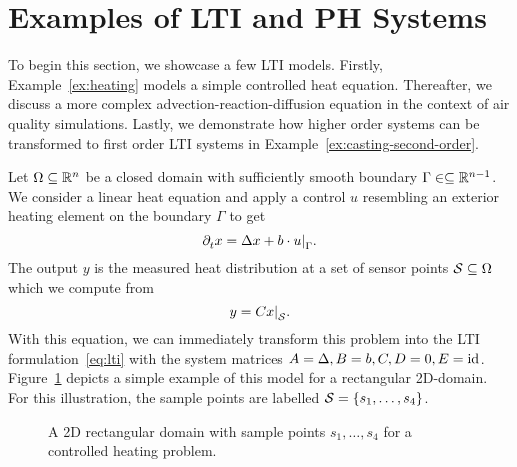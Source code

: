 \section{Examples of \texorpdfstring{\acs{LTI}}{LTI} and \texorpdfstring{\acs{PH}}{PH} Systems}\label{sec:examples}

To begin this section, we showcase a few \ac{LTI} models.
Firstly, Example~\ref{ex:heating} models a simple controlled heat equation.
Thereafter, we discuss a more complex advection-reaction-diffusion equation in the context of air quality simulations.
Lastly, we demonstrate how higher order systems can be transformed to first order \ac{LTI} systems in Example~\ref{ex:casting-second-order}.

\begin{example}\label{ex:heating}
    Let $\Omega \subseteq \mathbb{R}^n$ be a closed domain with sufficiently smooth boundary $\Gamma \in \subseteq \mathbb{R}^{n - 1}$.
    We consider a linear heat equation and apply a control $u$ resembling an exterior heating element on the boundary $\Gamma$ to get
    \begin{equation*}
        \pd[t]{} x = \lapl{x} + b \cdot \res{u}{\Gamma}.
    \end{equation*}
    The output $y$ is the measured heat distribution at a set of sensor points $\mathcal{S} \subseteq \Omega$ which we compute from
    \begin{equation*}
        y = C \res{x}{\mcl{S}}.
    \end{equation*}
    With this equation, we can immediately transform this problem into the \ac{LTI} formulation~\eqref{eq:lti} with the system matrices $A = \mathop{}\!\Delta{}, B = b, C, D = 0, E = \text{id}_{}$.
    Figure~\ref{fig:lti-heating} depicts a simple example of this model for a rectangular 2D-domain.
    For this illustration, the sample points are labelled $\mathcal{S} = \left\{s_1, \dots, s_4\right\}$.

    \begin{figure}[h]
        \centering
        \caption{A 2D rectangular domain with sample points $s_1, \dots, s_4$ for a controlled heating problem.}%
        \label{fig:lti-heating}
    \end{figure}
\end{example}

